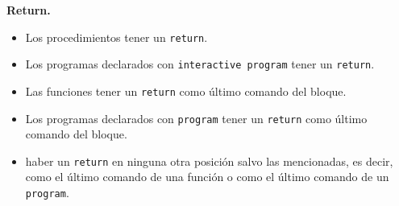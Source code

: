 \documentclass{article}
\begin{document}
{\bf Return.}
\begin{itemize}
\item Los procedimientos \NOPUEDEN tener un \texttt{return}.
\item Los programas declarados con \texttt{interactive program} \NOPUEDEN tener un \texttt{return}.
\item Las funciones \DEBEN tener un \texttt{return} como \'ultimo comando del bloque.
\item Los programas declarados con \texttt{program} \PUEDEN tener un \texttt{return} como \'ultimo comando del bloque.
\item \NOPUEDE haber un \texttt{return} en ninguna otra posici\'on salvo
      las mencionadas, es decir,
      como el \'ultimo comando de una funci\'on o como el \'ultimo comando de un \texttt{program}.
\end{itemize}
\end{document}
